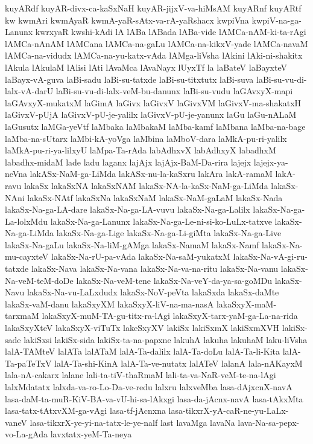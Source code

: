 {kuyARdf
kuyAR-divx-ca-kaSxNaH
kuyAR-jijxV-va-hiMsAM
kuyARnf
kuyARtf
kw
kwmAri
kwmAyaR
kwmA-yaR-sAtx-va-rA-yaRshacx
kwpiVna
kwpiV-na-ga-Lanunx
kwrxyaR
kwshi-kAdi
lA
lABa
lABada
lABa-vide
lAMCa-nAM-ki-ta-rAgi
lAMCa-nAnAM
lAMCana
lAMCa-na-gaLu
lAMCa-na-kikxV-yade
lAMCa-navaM
lAMCa-na-vidudx
lAMCa-na-yu-katx-vAda
lAMga-liVsha
lAkini
lAki-ni-shakitx
lAkula
lAkulaM
lAlisi
lAti
lAvaMca
lAvaNayx
lUyxTf
la
laBateV
laBayxteV
laBayx-vA-guva
laBi-sadu
laBi-su-tatxde
laBi-su-titxtutx
laBi-suva
laBi-su-vu-di-lalx-vA-darU
laBi-su-vu-di-lalx-veM-bu-danunx
laBi-su-vudu
laGAvxyX-mapi
laGAvxyX-mukatxM
laGimA
laGivx
laGivxV
laGivxVM
laGivxV-ma-shakatxH
laGivxV-pUjA
laGivxV-pU-je-yalilx
laGivxV-pU-je-yanunx
laGu
laGu-nALaM
laGusutx
laMGa-yeVtf
laMbaka
laMbakaM
laMba-kamf
laMbana
laMba-na-bage
laMba-na-sUtarx
laMbi-kA-yoVga
laMbina
laMboV-dara
laMkA-pu-ri-yalilx
laMkA-pu-ri-ya-lilxyU
laMpa-Ta-rAda
labAdhxvX
labAdhxyX
labadhxM
labadhx-midaM
lade
ladu
laganx
lajAjx
lajAjx-BaM-Da-rira
lajejx
lajejx-ya-neVna
lakASx-NaM-ga-LiMda
lakASx-nu-la-kaSxru
lakAra
lakA-ramaM
lakA-ravu
lakaSx
lakaSxNA
lakaSxNAM
lakaSx-NA-la-kaSx-NaM-ga-LiMda
lakaSx-NAni
lakaSx-NAtf
lakaSxNa
lakaSxNaM
lakaSx-NaM-gaLaM
lakaSx-Nada
lakaSx-Na-ga-LA-dare
lakaSx-Na-ga-LA-vuvu
lakaSx-Na-ga-Lalilx
lakaSx-Na-ga-La-lolxMdu
lakaSx-Na-ga-Lanunx
lakaSx-Na-ga-Le-ni-si-ko-LuLx-tatxve
lakaSx-Na-ga-LiMda
lakaSx-Na-ga-Lige
lakaSx-Na-ga-Li-giMta
lakaSx-Na-ga-Live
lakaSx-Na-gaLu
lakaSx-Na-liM-gAMga
lakaSx-NamaM
lakaSx-Namf
lakaSx-Na-mu-cayxteV
lakaSx-Na-rU-pa-vAda
lakaSx-Na-saM-yukatxM
lakaSx-Na-vA-gi-ru-tatxde
lakaSx-Nava
lakaSx-Na-vana
lakaSx-Na-va-na-ritu
lakaSx-Na-vanu
lakaSx-Na-veM-teM-doDe
lakaSx-Na-veM-tene
lakaSx-Na-veY-da-ya-sa-goMDu
lakaSx-Navu
lakaSx-Na-vu-LaLxdudx
lakaSx-NoV-peVta
lakaSxda
lakaSx-daMte
lakaSx-vaM-danu
lakaSxyXM
lakaSxyX-liV-na-ma-nasA
lakaSxyX-maM-tarxmaM
lakaSxyX-muM-TA-gu-titx-ra-lAgi
lakaSxyX-tarx-yaM-ga-La-na-rida
lakaSxyXteV
lakaSxyX-viTuTx
lakeSxyXV
lakiSx
lakiSxmX
lakiSxmXVH
lakiSx-sade
lakiSxsi
lakiSx-sida
lakiSx-ta-na-papxne
lakuhA
lakuha
lakuhaM
laku-liVsha
lalA-TAMteV
lalATa
lalATaM
lalA-Ta-dalilx
lalA-Ta-doLu
lalA-Ta-li-Kita
lalA-Ta-paTeTxV
lalA-Ta-shi-KinA
lalA-Ta-ve-nutatx
lalATeV
lalanA
lala-nAKayxM
lala-nA-cakarx
lalane
lali-ta-tiV-thaRmaM
lali-ta-va-NaR-veM-te-na-lAgi
lalxMdatatx
lalxda-va-ro-Lo-Da-ve-redu
lalxru
lalxveMba
lasa-dAjxcnX-navA
lasa-daM-ta-muR-KiV-BA-va-vU-hi-sa-lAkxgi
lasa-da-jAcnx-navA
lasa-tAkxMta
lasa-tatx-tAtxvXM-ga-vAgi
lasa-tf-jAcnxna
lasa-tikxrX-yA-caR-ne-yu-LaLx-vaneV
lasa-tikxrX-ye-yi-na-tatx-le-ye-nalf
last
lavaMga
lavaNa
lava-Na-sa-pepx-vo-La-gAda
lavxtatx-yeM-Ta-neya
}
